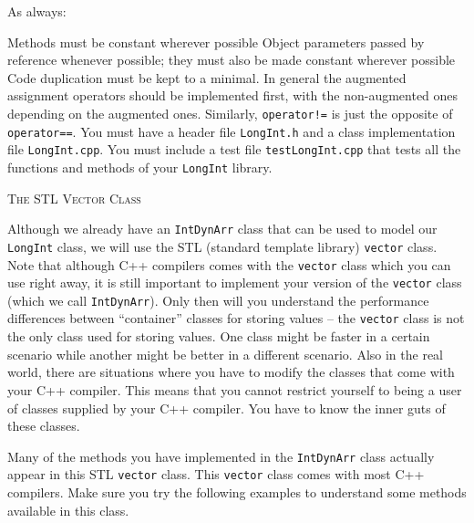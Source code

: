 As always:
\begin{tightlist}
    \li Methods must be constant wherever possible
    \li Object parameters passed by reference whenever possible; 
    they must also be made constant wherever possible
    \li Code duplication must be kept to a minimal. In general 
    the augmented assignment operators should be implemented first, 
    with the non-augmented ones depending on the augmented ones. 
    Similarly, \texttt{operator!=} is just the opposite of
    \verb!operator==!.
    \li You must have a header file \verb!LongInt.h! and a class 
    implementation file \verb!LongInt.cpp!.
    \li You must include a test file \verb!testLongInt.cpp! that 
    tests all the functions and methods of your \verb!LongInt! library.
\end{tightlist}


\newpage
\textsc{The STL Vector Class}

Although we already have an \verb!IntDynArr! class that can be used 
to model our \verb!LongInt! class, we will use the STL (standard 
template library) \verb!vector! class. Note that although C++ 
compilers comes with the \verb!vector! class which you can use right 
away, it is still important to implement your version of the 
\verb!vector! class (which we call \verb!IntDynArr!). Only then will 
you understand the performance differences between “container” classes  
for storing values -- the \verb!vector! class is not the only class used 
for storing values. One class might be faster in a certain scenario while 
another might be better in a different scenario. Also in the real world, 
there are situations where you have to modify the classes that come with 
your C++ compiler. This means that you cannot restrict yourself to being 
a user of classes supplied by your C++ compiler. You have to know the 
inner guts of these classes.

Many of the methods you have implemented in the \verb!IntDynArr! class 
actually appear in this STL \verb!vector! class. This \verb!vector! class 
comes with most C++ compilers. Make sure you try the following examples 
to understand some methods available in this class.

